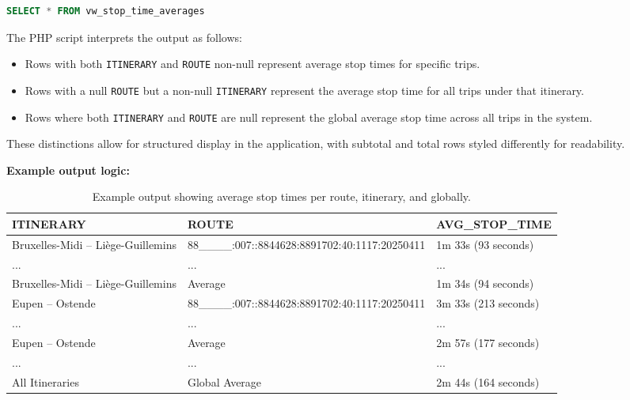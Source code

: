 \documentclass[a4paper, 12pt]{article}
\begin{document}
\begin{lstlisting}[language=SQL]
SELECT * FROM vw_stop_time_averages
\end{lstlisting}

The PHP script interprets the output as follows:

\begin{itemize}
    \item Rows with both \texttt{ITINERARY} and \texttt{ROUTE} non-null represent average stop times for specific trips.
    \item Rows with a null \texttt{ROUTE} but a non-null \texttt{ITINERARY} represent the average stop time for all trips under that itinerary.
    \item Rows where both \texttt{ITINERARY} and \texttt{ROUTE} are null represent the global average stop time across all trips in the system.
\end{itemize}

These distinctions allow for structured display in the application, with subtotal and total rows styled differently for readability.

\textbf{Example output logic:}

\begin{table}[ht]
    \centering
    \footnotesize
    \caption{Example output showing average stop times per route, itinerary, and globally.}
    \label{tab:p3-task5-avg-stop-time}
    \begin{tabular}{lll}
    \toprule
    \textbf{ITINERARY} & \textbf{ROUTE} & \textbf{AVG\_STOP\_TIME} \\
    \midrule
    Bruxelles-Midi -- Liège-Guillemins & 88\_\_\_\_:007::8844628:8891702:40:1117:20250411 & 1m 33s (93 seconds) \\
    ... & ... & ... \\
    Bruxelles-Midi -- Liège-Guillemins & Average & 1m 34s (94 seconds) \\
    \hline
    Eupen -- Ostende & 88\_\_\_\_:007::8844628:8891702:40:1117:20250411 & 3m 33s (213 seconds) \\
    ... & ... & ... \\
    Eupen -- Ostende & Average & 2m 57s (177 seconds) \\
    \hline
    ... & ... & ... \\
    \hline
    All Itineraries & Global Average & 2m 44s (164 seconds) \\
    \bottomrule
    \end{tabular}
\end{table}
\end{document}
